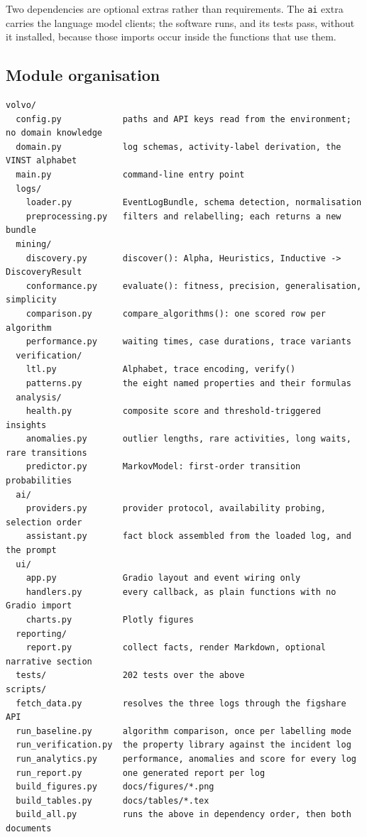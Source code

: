 \documentclass[12pt,a4paper]{article}
\begin{document}
Two dependencies are optional extras rather than requirements. The \texttt{ai}
extra carries the language model clients; the software runs, and its tests pass,
without it installed, because those imports occur inside the functions that use
them.

\subsection{Module organisation}

\begin{lstlisting}
volvo/
  config.py            paths and API keys read from the environment; no domain knowledge
  domain.py            log schemas, activity-label derivation, the VINST alphabet
  main.py              command-line entry point
  logs/
    loader.py          EventLogBundle, schema detection, normalisation
    preprocessing.py   filters and relabelling; each returns a new bundle
  mining/
    discovery.py       discover(): Alpha, Heuristics, Inductive -> DiscoveryResult
    conformance.py     evaluate(): fitness, precision, generalisation, simplicity
    comparison.py      compare_algorithms(): one scored row per algorithm
    performance.py     waiting times, case durations, trace variants
  verification/
    ltl.py             Alphabet, trace encoding, verify()
    patterns.py        the eight named properties and their formulas
  analysis/
    health.py          composite score and threshold-triggered insights
    anomalies.py       outlier lengths, rare activities, long waits, rare transitions
    predictor.py       MarkovModel: first-order transition probabilities
  ai/
    providers.py       provider protocol, availability probing, selection order
    assistant.py       fact block assembled from the loaded log, and the prompt
  ui/
    app.py             Gradio layout and event wiring only
    handlers.py        every callback, as plain functions with no Gradio import
    charts.py          Plotly figures
  reporting/
    report.py          collect facts, render Markdown, optional narrative section
  tests/               202 tests over the above
scripts/
  fetch_data.py        resolves the three logs through the figshare API
  run_baseline.py      algorithm comparison, once per labelling mode
  run_verification.py  the property library against the incident log
  run_analytics.py     performance, anomalies and score for every log
  run_report.py        one generated report per log
  build_figures.py     docs/figures/*.png
  build_tables.py      docs/tables/*.tex
  build_all.py         runs the above in dependency order, then both documents
\end{lstlisting}
\end{document}
